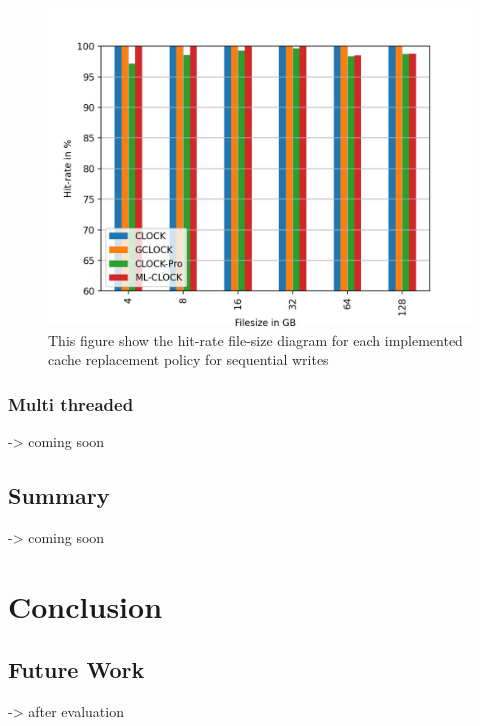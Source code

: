 \documentclass[
	12pt,
	a4paper,
	abstract,
	bibliography=totoc,
	chapterprefix,
	headings=openright,
	numbers=endperiod,
	parskip=half,
	twoside,
]{scrreprt}
\begin{document}
\begin{figure}[ht]
	\centering
	\includegraphics[scale=0.45]{seq_write.jpg}		
	\caption{This figure show the hit-rate file-size diagram for each implemented 		cache replacement policy for sequential writes}
	\label{fig:seq write}
\end{figure}
	

\subsection{Multi threaded}

-> coming soon

\section{Summary}

-> coming soon

\chapter{Conclusion}
\label{cha:conclusion}

\section{Future Work}

-> after evaluation





\end{document}
